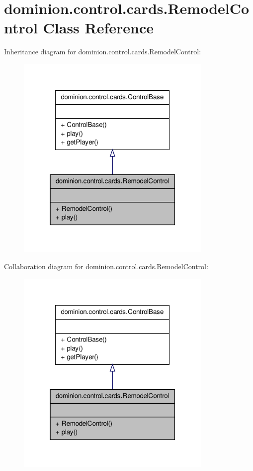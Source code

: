 \hypertarget{classdominion_1_1control_1_1cards_1_1RemodelControl}{\section{dominion.\-control.\-cards.\-Remodel\-Control \-Class \-Reference}
\label{classdominion_1_1control_1_1cards_1_1RemodelControl}
}


\-Inheritance diagram for dominion.\-control.\-cards.\-Remodel\-Control\-:
\nopagebreak
\begin{figure}[H]
\begin{center}
\leavevmode
\includegraphics[width=268pt]{classdominion_1_1control_1_1cards_1_1RemodelControl__inherit__graph}
\end{center}
\end{figure}


\-Collaboration diagram for dominion.\-control.\-cards.\-Remodel\-Control\-:
\nopagebreak
\begin{figure}[H]
\begin{center}
\leavevmode
\includegraphics[width=268pt]{classdominion_1_1control_1_1cards_1_1RemodelControl__coll__graph}
\end{center}
\end{figure}
